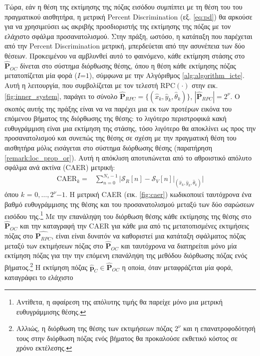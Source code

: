 Τώρα, εάν η θέση της εκτίμησης της πόζας εισόδου συμπίπτει με τη θέση του του
πραγματικού αισθητήρα, η μετρική Percent Discrimination (εξ. \ref{eq:pd}) θα
αρκούσε για να χρησιμεύσει ως ακριβής προσδιοριστής της εκτίμησης της πόζας με
τον ελάχιστο σφάλμα προσανατολισμού. Στην πράξη, ωστόσο, η κατάταξη που
παρέχεται από την Percent Discrimination μετρική, μπερδεύεται από την ασυνέπεια
των δύο θέσεων.  Προκειμένου να αμβλυνθεί αυτό το φαινόμενο, κάθε εκτίμηση
στάσης στο $\hat{\bm{P}}_{OC}$ δίνεται στο σύστημα διόρθωσης θέσης, όπου η θέση
κάθε εκτίμησης πόζας μετατοπίζεται μία φορά ($I$=$1$), σύμφωνα με την
Αλγόριθμος \ref{alg:algorithm_icte}. Αυτή η λειτουργία, που συμβολίζεται με τον
τελεστή RPC$(\cdot)$ στην εικ. \ref{fig:inner_system}, παράγει το σύνολο
$\hat{\bm{P}}_{RPC} = \{(\hat{x}_k, \hat{y}_k, \hat{\theta}_k)\}$,
$|\hat{\bm{P}}_{RPC}| = 2^\nu$.  Ο σκοπός αυτής της πράξης είναι να να παρέχει
μια εκ των προτέρων εικόνα του επόμενου βήματος της διόρθωσης της θέσης: το
λιγότερο περιστροφικά κακή ευθυγράμμιση είναι μια εκτίμηση της στάσης, τόσο
λιγότερο θα αποκλίνει ως προς την προσανατολισμού και συνεπώς της θέσης σε
σχέση με την πραγματική θέση του αισθητήρα μόλις εισάγεται στο σύστημα
διόρθωσης θέσης (παρατήρηση \ref{remark:loc_prop_or}).  Αυτή η απόκλιση
αποτυπώνεται από το αθροιστικό απόλυτο σφάλμα ανά ακτίνα (CAER) μετρική:
\begin{align}
  \text{CAER}_k = & \sum\limits_{n=0}^{N_s-1} \Bigg| \mathcal{S}_R[n] - \mathcal{S}_V[n]\Big|_{(\hat{x}_k, \hat{y}_k, \hat{\theta}_k)} \Bigg|
  \label{eq:caer}
\end{align}
όπου $k$ = $0,\dots,2^\nu$$-$$1$. Η μετρική CAER (εικ. \ref{fig:caer})
κωδικοποιεί ταυτόχρονα ένα βαθμό ευθυγράμμισης της θέσης και του
προσανατολισμού μεταξύ των δύο σαρώσεων εισόδου της.\footnote{Αντίθετα, η
αφαίρεση της απόλυτης τιμής θα παρείχε μόνο μια μετρική ευθυγράμμισης θέσης.}
Με την επανάληψη του διόρθωση θέσης κάθε εκτίμησης της θέσης στο
$\hat{\bm{P}}_{OC}$ και την καταγραφή την CAER για κάθε μια από τις
μετατοπισμένες εκτιμήσεις πόζας στο $\hat{\bm{P}_{RPC}}$, είναι είναι δυνατόν
να καθοριστεί μια κατάταξη σφάλματος πόζας μεταξύ των εκτιμήσεων πόζας στο
$\hat{\bm{P}}_{OC}$ και ταυτόχρονα να διατηρείται μόνο μία εκτίμηση πόζας για
την την επόμενη επανάληψη της μεθόδου διόρθωσης πόζας ενός
βήματος.\footnote{Αλλιώς, η διόρθωση της θέσης των εκτιμήσεων πόζας $2^\nu$ και
η επανατροφοδότησή τους στην διόρθωση πόζας ενός βήματος θα προκαλούσε εκθετικό
κόστος σε χρόνο εκτέλεσης.} Η εκτίμηση πόζας $\hat{\bm{p}}_C \in
\hat{\bm{P}}_{OC}$ η οποία, όταν μεταφράζεται μία φορά, καταγράφει το ελάχιστο
